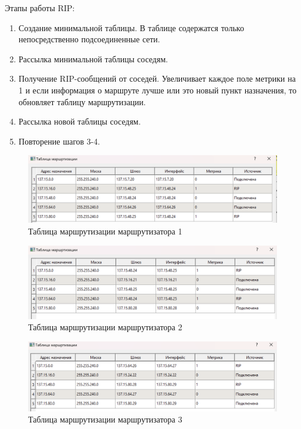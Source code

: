 \documentclass[12pt,onecolumn]{article}
\begin{document}
Этапы работы RIP:
\begin{enumerate}
    \item Создание минимальной таблицы. В таблице содержатся только непосредственно подсоединенные сети.
    \item Рассылка минимальной таблицы соседям.
    \item Получение RIP-сообщений от соседей.  Увеличивает каждое поле метрики на 1 и если информация о маршруте лучше или это новый пункт назначения, то обновляет таблицу маршрутизации.
    \item Рассылка новой таблицы соседям. 
    \item Повторение шагов 3-4.
\end{enumerate}

\begin{figure}[H]
    \centering
    \includegraphics[width=\textwidth]{image/part-4/router1.png}
    \caption{Таблица маршрутизации маршрутизатора 1}
\end{figure}
\begin{figure}[H]
    \centering
    \includegraphics[width=\textwidth]{image/part-4/router2.png}
    \caption{Таблица маршрутизации маршрутизатора 2}
\end{figure}
\begin{figure}[H]
    \centering
    \includegraphics[width=\textwidth]{image/part-4/router3.png}
    \caption{Таблица маршрутизации маршрутизатора 3}
\end{figure}
\end{document}
